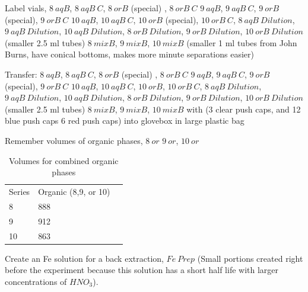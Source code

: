 \documentclass[idxtotoc,hyperref,openany,oneside]{labbook} %
\newcommand{\cmark}{\ding{51}}%
\newcommand{\done}{\rlap{$\square$}{\raisebox{2pt}{\large\hspace{1pt}\cmark}}%
  \hspace{-2.5pt}}
\begin{document}
\begin{todolist}
\item[\done]{Label vials,
  $\boxed{8\ aqB}$,
  $\boxed{8\ aqB\ C}$,  $\boxed{8\ orB}$ (special) \smiley,
  $\boxed{8\ orB\ C}$
  $\boxed{9\ aqB}$,  $\boxed{9\ aqB\ C}$,  $\boxed{9\ orB}$ (special),
  $\boxed{9\ orB\ C}$
  $\boxed{10\ aqB}$, $\boxed{10\ aqB\ C}$, $\boxed{10\ orB}$ (special),
  $\boxed{10\ orB\ C}$,
  $\boxed{8\ aqB\ Dilution}$,
  $\boxed{9\ aqB\ Dilution}$,
  $\boxed{10\ aqB\ Dilution}$,
  $\boxed{8\ orB\ Dilution}$,
  $\boxed{9\ orB\ Dilution}$,
  $\boxed{10\ orB\ Dilution}$ (smaller 2.5 ml tubes)
  $\boxed{8\ mixB}$, $\boxed{9\ mixB}$,
    $\boxed{10\ mixB}$ (smaller 1 ml tubes from John Burns,
    have conical bottoms, makes more minute separations easier)}

\item[\done]{Transfer:
  $\boxed{8\ aqB}$,
  $\boxed{8\ aqB\ C}$,  $\boxed{8\ orB}$ (special) \smiley,
  $\boxed{8\ orB\ C}$
  $\boxed{9\ aqB}$,  $\boxed{9\ aqB\ C}$,  $\boxed{9\ orB}$ (special),
  $\boxed{9\ orB\ C}$
  $\boxed{10\ aqB}$, $\boxed{10\ aqB\ C}$, $\boxed{10\ orB}$,
  $\boxed{10\ orB\ C}$,
  $\boxed{8\ aqB\ Dilution}$,
  $\boxed{9\ aqB\ Dilution}$,
  $\boxed{10\ aqB\ Dilution}$,
  $\boxed{8\ orB\ Dilution}$,
  $\boxed{9\ orB\ Dilution}$,
  $\boxed{10\ orB\ Dilution}$ (smaller 2.5 ml tubes)
  $\boxed{8\ mixB}$, $\boxed{9\ mixB}$,
    $\boxed{10\ mixB}$ with
  (3 clear push caps, and 12 blue push caps
  6 red push caps) into glovebox in large plastic bag}

\item[\done]{Remember volumes of organic phases, $\boxed{8\ or}$
     $\boxed{9\ or}$, $\boxed{10\ or}$}
\begin{table}[H]
  \begin{center}
    \caption{Volumes for combined organic phases}
    \begin{tabular}{l l l}
      \toprule
      Series & Organic (8,9, or 10)\\ 
      8 & 888\\
      9 & 912\\
      10 & 863\\
      \bottomrule
    \end{tabular}
  \end{center}
\end{table}  
\end{todolist}


Create an Fe solution for a back extraction, $\boxed{Fe\ Prep}$
(Small portions created right before the experiment because this
solution has a short half life with larger concentrations of $HNO_3$).
\end{document}
